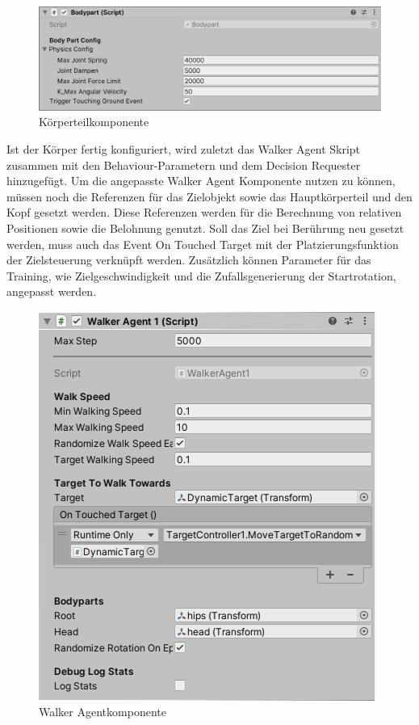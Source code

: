 \begin{figure}[H]
  \centering  
  \includegraphics[scale=0.5]{img/komponente_bodypart}
  \caption{Körperteilkomponente}
  \label{fig:komponente_bodypart}
\end{figure}

Ist der Körper fertig konfiguriert, wird zuletzt das Walker Agent Skript zusammen mit den Behaviour-Parametern und dem Decision Requester hinzugefügt. Um die angepasste Walker Agent Komponente nutzen zu können, müssen noch die Referenzen für das Zielobjekt sowie das Hauptkörperteil und den Kopf gesetzt werden. Diese Referenzen werden für die Berechnung von relativen Positionen sowie die Belohnung genutzt. Soll das Ziel bei Berührung neu gesetzt werden, muss auch das Event \grqq{}On Touched Target\grqq{} mit der Platzierungsfunktion der Zielsteuerung verknüpft werden. Zusätzlich können Parameter für das Training, wie Zielgeschwindigkeit und die Zufallsgenerierung der Startrotation, angepasst werden.

\begin{figure}[H]
  \centering  
  \includegraphics[scale=0.5]{img/komponente_agent_walker1}
  \caption{Walker Agentkomponente}
  \label{fig:komponente_agent_walker1}
\end{figure}


